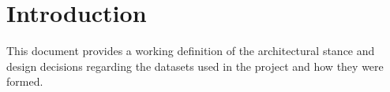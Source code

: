 \chapter{Introduction}
\label{sec:introduction}
	
	This document provides a working definition of the architectural stance and design decisions regarding the datasets used in the project and how they were formed. 
	
